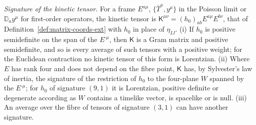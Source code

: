 \emph{Signature of the kinetic tensor.} For a frame \(E^{a\mu}\), \(\{\bar T^a,y^\mu\}\) in the Poisson limit or \(\mathbb D_ay^\mu\) for first-order operators, the kinetic tensor is \(\mathsf K^{\mu\nu}=(h_0)_{ab}E^{a\mu}E^{b\nu}\), that of Definition~\ref{def:matrix-coords-ext} with \(h_0\) in place of \(\eta_{IJ}\). (i) If \(h_0\) is positive semidefinite on the span of the \(E^{\cdot\mu}\), then \(\mathsf K\) is a Gram matrix and positive semidefinite, and so is every average of such tensors with a positive weight; for the Euclidean contraction no kinetic tensor of this form is Lorentzian. (ii) Where \(E\) has rank four and does not depend on the fibre point, \(\mathsf K\) has, by Sylvester's law of inertia, the signature of the restriction of \(h_0\) to the four-plane \(W\) spanned by the \(E^{\cdot\mu}\); for \(h_0\) of signature \((9,1)\) it is Lorentzian, positive definite or degenerate according as \(W\) contains a timelike vector, is spacelike or is null. (iii) An average over the fibre of tensors of signature \((3,1)\) can have another signature.

